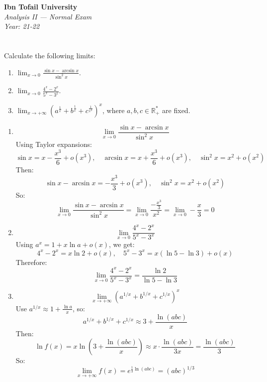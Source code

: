 \documentclass[12pt]{article}
\begin{document}
\begin{center}
  \Large\textbf{Ibn Tofail University} \\[1em]
  \large\textit{Analysis II — Normal Exam} \\[0.5em]
  \large\textit{Year: 21-22} \\[2em]
\end{center}

\vspace{0.5cm}

\section{}
Calculate the following limits:
\begin{enumerate}
    \item $\displaystyle \lim_{x \to 0} \frac{\sin x - \arcsin x}{\sin^2 x}$.
    
    \item $\displaystyle \lim_{x \to 0} \frac{4^x - 2^x}{5^x - 3^x}$.
    
    \item $\displaystyle \lim_{x \to +\infty} \left(a^\frac{1}{x} + b^\frac{1}{x} + 
    c^\frac{1}{x^3}\right)^x$, where $a, b, c \in \mathbb{R}^*_+$ are fixed.
\end{enumerate}

\newpage

\begin{answerbox}
  \begin{enumerate}
    \item 
    $$
    \lim_{x \to 0} \frac{\sin x - \arcsin x}{\sin^2 x}
    $$
    Using Taylor expansions:
    $$
    \sin x = x - \frac{x^3}{6} + o(x^3), \quad \arcsin x = x + \frac{x^3}{6} + o(x^3), \quad \sin^2 x = x^2 + o(x^2)
    $$
    Then:
    $$
    \sin x - \arcsin x = -\frac{x^3}{3} + o(x^3), \quad \sin^2 x = x^2 + o(x^2)
    $$
    So:
    $$
    \lim_{x \to 0} \frac{\sin x - \arcsin x}{\sin^2 x} = \lim_{x \to 0} \frac{-\frac{x^3}{3}}{x^2} = \lim_{x \to 0} -\frac{x}{3} = 0
    $$
    \item 
    $$
    \lim_{x \to 0} \frac{4^x - 2^x}{5^x - 3^x}
    $$
    Using $ a^x = 1 + x \ln a + o(x) $, we get:
    $$
    4^x - 2^x = x \ln 2 + o(x), \quad 5^x - 3^x = x(\ln 5 - \ln 3) + o(x)
    $$
    Therefore:
    $$
    \lim_{x \to 0} \frac{4^x - 2^x}{5^x - 3^x} = \frac{\ln 2}{\ln 5 - \ln 3}
    $$

    \item 
    $$
    \lim_{x \to +\infty} \left(a^{1/x} + b^{1/x} + c^{1/x}\right)^x
    $$
    Use $ a^{1/x} \approx 1 + \frac{\ln a}{x} $, so:
    $$
    a^{1/x} + b^{1/x} + c^{1/x} \approx 3 + \frac{\ln(abc)}{x}
    $$
    Then:
    $$
    \ln f(x) = x \ln\left(3 + \frac{\ln(abc)}{x}\right) \approx x \cdot \frac{\ln(abc)}{3x} = \frac{\ln(abc)}{3}
    $$
    So:
    $$
    \lim_{x \to +\infty} f(x) = e^{\frac{1}{3} \ln(abc)} = (abc)^{1/3}
    $$
\end{enumerate}
\end{answerbox}
\end{document}
